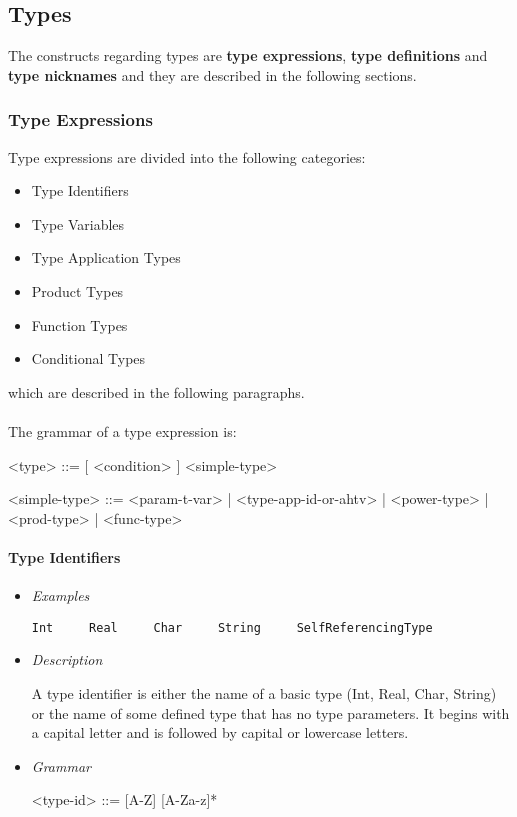 \documentclass{article}
\begin{document}
\subsection{Types}
\label{subsec:types}

The constructs regarding types are \textbf{type expressions}, \textbf{type
definitions} and \textbf{type nicknames} and they are described in the
following sections.

\subsubsection{Type Expressions}

Type expressions are divided into the following categories:
\begin{itemize}
\item Type Identifiers
\item Type Variables
\item Type Application Types
\item Product Types
\item Function Types
\item Conditional Types
\end{itemize}
which are described in the following paragraphs.
\\\\
The grammar of a type expression is:
\begin{grammar}
<type> ::= [ <condition> ]  <simple-type>

<simple-type> ::=
<param-t-var> | <type-app-id-or-ahtv> | <power-type> | <prod-type> |
<func-type>
\end{grammar}

\paragraph{Type Identifiers}

\begin{itemize}
\item \textit{Examples}
\begin{verbatim}
Int     Real     Char     String     SelfReferencingType
\end{verbatim}

\item \textit{Description}

A type identifier is either the name of a basic type (Int, Real, Char, String)
or the name of some defined type that has no type parameters. It begins with a
capital letter and is followed by capital or lowercase letters.

\item \textit{Grammar}
\begin{grammar}
<type-id> ::= [A-Z] [A-Za-z]*
\end{grammar}
\end{itemize}
\end{document}
